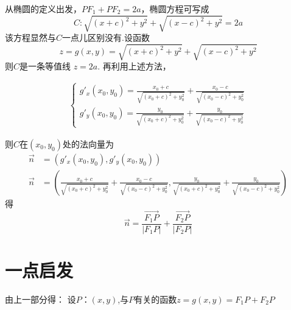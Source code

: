 \documentclass[12pt,a4paper]{article}
\renewcommand{\(}{\left(}
\renewcommand{\)}{\right)}
\renewcommand{\l}{\left| }
\renewcommand{\r}{\right|}
\newcommand{\bvec}[1]{\overrightarrow{#1}}
\begin{document}
从椭圆的定义出发，$PF_1+PF_2=2a$，椭圆方程可写成
$$ C:  \sqrt{\( x+c \)^2 +y^2}+ \sqrt{ \( x-c \)^2 +y^2 }=2a  $$
该方程显然与$C$一点儿区别没有.设函数
$$ z= g \( x,y \) =\sqrt{\( x+c \)^2 +y^2}+ \sqrt{ \( x-c \)^2 +y^2 } $$
则$C$是一条等值线 $z=2a$.
再利用上述方法，

\begin{align*}
\begin{cases}
g'_x \( x_0,y_0 \)=\frac{   x_0+c}{  \sqrt{\( x_0+c \)^2 +y_0^2}} + \frac{   x_0-c}{  \sqrt{\( x_0-c \)^2 +y_0^2}}            \\
g'_y  \( x_0,y_0 \)=\frac{   y_0}{  \sqrt{\( x_0+c \)^2 +y_0^2}} + \frac{   y_0}{  \sqrt{\( x_0-c \)^2 +y_0^2}}    
\end{cases}
\end{align*}

则$C$在$  \( x_0 , y_0 \)  $处的法向量为
\begin{align*}
  \vec{n}    & =   \( g'_x \(x_0,y_0 \),g'_y\(x_0,y_0 \) \)     \\
 \vec{n}     &=   \( \frac{   x_0+c}{  \sqrt{\( x_0+c \)^2 +y_0^2}} + \frac{   x_0-c}{  \sqrt{\( x_0-c \)^2 +y_0^2}},     \frac{   y_0}{  \sqrt{\( x_0+c \)^2 +y_0^2}} + \frac{   y_0}{  \sqrt{\( x_0-c \)^2 +y_0^2}}\)    
\end{align*}
得
$$     \vec{n}    =    \frac{  \bvec{F_1P}  }{   \l   F_1P  \r  }   +\frac{  \bvec{  F_2P  }  }{   \l F_2P  \r  }  $$

\section{   一点启发 }
由上一部分得：
设$P{ }： \( x,y \) $,与$P$有关的函数$ z= g \( x,y \)= F_1P +F_2P $
\end{document}
